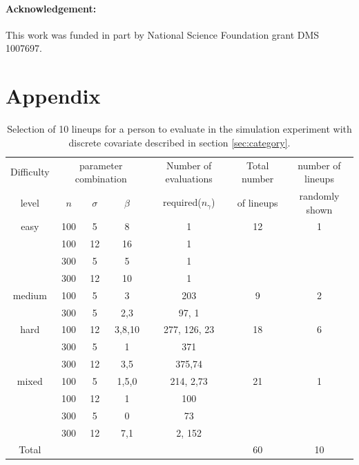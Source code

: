 \documentclass{article}
\begin{document}



\paragraph{Acknowledgement:}

This work was funded in part by National Science Foundation grant DMS 1007697.

%
%

%


\section*{Appendix}

\begin{table}[hbtp]
\caption{Selection of 10 lineups for a person to evaluate in the simulation experiment with discrete covariate described in section \ref{sec:category}.} 
\centering
\begin{tabular}{c c c c  c c c}
\hline\hline
Difficulty& \multicolumn{3}{c}{parameter combination}& Number of evaluations &Total number  & number of lineups\\
level & $n$ & $\sigma$ & $\beta$ &required($n_{\gamma}$) & of lineups & randomly shown \\
\hline
easy&100& 5&8 & 1& 12 & 1\\
&100&12&16 &1&&\\
&300& 5&5 &1&&\\
&300&12&10 &1 &&\\
\hline
medium&100& 5&3 &203 & 9 &2\\
&300& 5&2,3 & 97, 1&&\\
\hline
hard&100&12&3,8,10 & 277, 126, 23& 18 &6\\
&300& 5&1 & 371 &&\\
&300&12&3,5& 375,74 &&\\
\hline
mixed&100& 5&1,5,0& 214, 2,73 & 21 &1\\
&100&12&1& 100& &\\
&300& 5&0 & 73&&\\
&300&12&7,1& 2, 152&&\\
\hline
Total &&&&&60&10\\
\hline
\end{tabular}
\label{tbl:dist_lineup1}
\end{table} 
\end{document}
